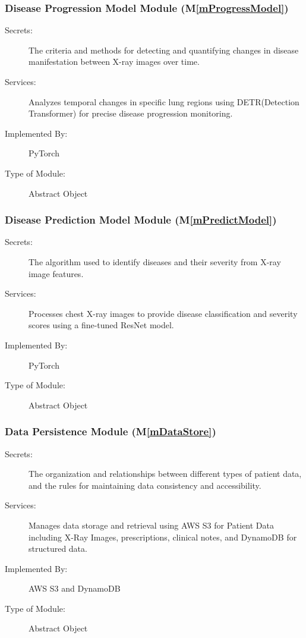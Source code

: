 \documentclass[12pt, titlepage]{article}
\newcommand{\mref}[1]{M\ref{#1}}
\begin{document}
\subsubsection{Disease Progression Model Module (\mref{mProgressModel})}
\begin{description}
\item[Secrets:] The criteria and methods for detecting and quantifying changes in disease manifestation between X-ray images over time.
\item[Services:] Analyzes temporal changes in specific lung regions using DETR(Detection Transformer) for precise disease progression monitoring.
\item[Implemented By:] PyTorch
\item[Type of Module:] Abstract Object
\end{description}

\subsubsection{Disease Prediction Model Module (\mref{mPredictModel})}
\begin{description}
\item[Secrets:] The algorithm used to identify diseases and their severity from X-ray image features.
\item[Services:] Processes chest X-ray images to provide disease classification and severity scores using a fine-tuned ResNet model.
\item[Implemented By:] PyTorch
\item[Type of Module:] Abstract Object
\end{description}

\subsubsection{Data Persistence Module (\mref{mDataStore})}
\begin{description}
\item[Secrets:] The organization and relationships between different types of patient data, and the rules for maintaining data consistency and accessibility.
\item[Services:] Manages data storage and retrieval using AWS S3 for Patient Data including X-Ray Images, prescriptions, clinical notes, and DynamoDB for structured data.
\item[Implemented By:] AWS S3 and DynamoDB
\item[Type of Module:] Abstract Object
\end{description}
\end{document}

